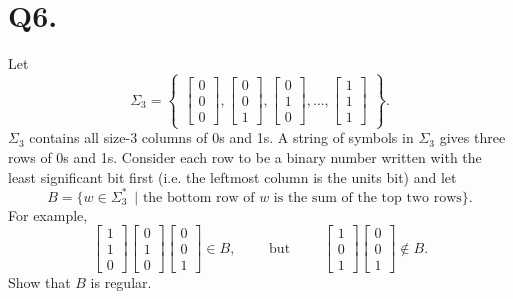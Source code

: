 \documentclass[]{article}
\begin{document}
	\section*{Q6.}
	Let $$\Sigma_3 = \begin{Bmatrix} \begin{bmatrix} 0 \\ 0 \\ 0 \end{bmatrix},  \begin{bmatrix} 0 \\ 0 \\ 1 \end{bmatrix}, \begin{bmatrix} 0 \\ 1 \\ 0 \end{bmatrix}, \dots, \begin{bmatrix} 1 \\ 1 \\ 1 \end{bmatrix} \end{Bmatrix}.$$
	$\Sigma_3$ contains all size-3 columns of 0s and 1s. A string of symbols in $\Sigma_3$ gives three rows of 0s and 1s.	Consider each row to be a binary number written with the least significant bit first (i.e. the leftmost
	column is the units bit) and let
	$$ B = \{w \in \Sigma_3^{*} \enspace | \text{ the bottom row of } w \text{ is the sum of the top two rows} \}. $$
	For example,
	$$ \begin{bmatrix} 1 \\ 1 \\ 0 \end{bmatrix} \begin{bmatrix} 0 \\ 1 \\ 0 \end{bmatrix} \begin{bmatrix} 0 \\ 0 \\ 1 \end{bmatrix} \in B, \qquad \text{ but } \qquad \begin{bmatrix} 1 \\ 0 \\ 1 \end{bmatrix} \begin{bmatrix} 0 \\ 0 \\ 1 \end{bmatrix} \not\in B. $$
	Show that $B$ is regular.
	
\end{document}
